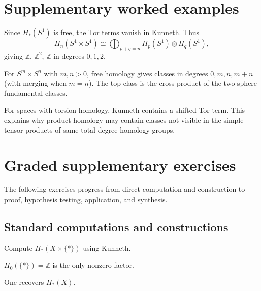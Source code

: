 \section{Supplementary worked examples}
\label{sec:viii27-pedagogy}

\begin{example}\label{ex:viii27-ped-01}
Since $H_*(S^1)$ is free, the Tor terms vanish in Kunneth. Thus
\[
H_n(S^1\times S^1)\cong\bigoplus_{p+q=n}H_p(S^1)\otimes H_q(S^1),
\]
giving $\mathbb Z$, $\mathbb Z^2$, $\mathbb Z$ in degrees $0,1,2$.
\end{example}

\begin{example}\label{ex:viii27-ped-02}
For $S^m\times S^n$ with $m,n>0$, free homology gives classes in degrees $0,m,n,m+n$ (with merging when $m=n$). The top class is the cross product of the two sphere fundamental classes.
\end{example}

\begin{example}\label{ex:viii27-ped-03}
For spaces with torsion homology, Kunneth contains a shifted Tor term. This explains why product homology may contain classes not visible in the simple tensor products of same-total-degree homology groups.
\end{example}

\section{Graded supplementary exercises}
The following exercises progress from direct computation and construction to proof, hypothesis testing, application, and synthesis.

\subsection*{Standard computations and constructions}

\begin{exercise}\label{exr:viii27-ped-01}
Compute $H_*(X\times\{*\})$ using Kunneth.
\end{exercise}
\begin{hint}
$H_0(\{*\})=\mathbb Z$ is the only nonzero factor.
\end{hint}
\begin{solution}
One recovers $H_*(X)$.
\end{solution}

